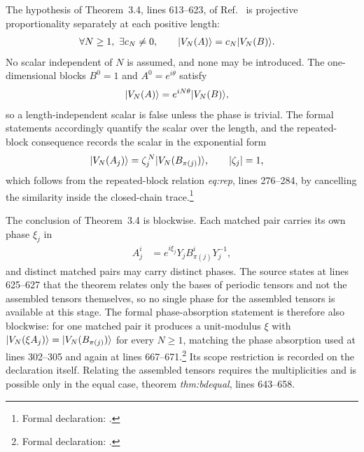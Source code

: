 \documentclass{article}
\begin{document}
The hypothesis of Theorem~3.4, lines 613--623, of
Ref.~\cite{DeLasCuevas2017Irreducible} is projective proportionality separately
at each positive length:
\begin{align}
    \forall N\geq1,\ \exists c_N\neq0,\qquad
    |V_N(A)\rangle
    &=c_N|V_N(B)\rangle.
    \label{eq:dccsp17_periodic_overlap_route_alignment_per_length_proportionality}
\end{align}
No scalar independent of $N$ is assumed, and none may be introduced. The
one-dimensional blocks $B^0=1$ and $A^0=e^{i\theta}$ satisfy
\begin{align}
    |V_N(A)\rangle
    &=e^{iN\theta}|V_N(B)\rangle,
    \label{eq:dccsp17_periodic_overlap_route_alignment_phase_power_example}
\end{align}
so a length-independent scalar is false unless the phase is trivial. The
formal statements accordingly quantify the scalar over the length, and the
repeated-block consequence records the scalar in the exponential form
\begin{align}
    |V_N(A_j)\rangle
    &=\zeta_j^{\,N}|V_N(B_{\pi(j)})\rangle,
    \qquad|\zeta_j|=1,
    \label{eq:dccsp17_periodic_overlap_route_alignment_blockwise_phase_power}
\end{align}
which follows from the repeated-block relation \emph{eq:rep}, lines 276--284,
by cancelling the similarity inside the closed-chain trace.\footnote{Formal
declaration:
.}

The conclusion of Theorem~3.4 is blockwise. Each matched pair carries its own
phase $\xi_j$ in
\begin{align}
    A_j^i
    &=e^{i\xi_j}Y_jB_{\pi(j)}^iY_j^{-1},
    \label{eq:dccsp17_periodic_overlap_route_alignment_blockwise_relation}
\end{align}
and distinct matched pairs may carry distinct phases. The source states at
lines 625--627 that the theorem relates only the bases of periodic tensors and
not the assembled tensors themselves, so no single phase for the assembled
tensors is available at this stage. The formal phase-absorption statement is
therefore also blockwise: for one matched pair it produces a unit-modulus
$\xi$ with $|V_N(\xi A_j)\rangle=|V_N(B_{\pi(j)})\rangle$ for every $N\geq1$,
matching the phase absorption used at lines 302--305 and again at lines
667--671.\footnote{Formal declaration:
.} Its
scope restriction is recorded on the declaration itself. Relating the
assembled tensors requires the multiplicities and is possible only in the
equal case, theorem \emph{thm:bdequal}, lines 643--658.
\end{document}
